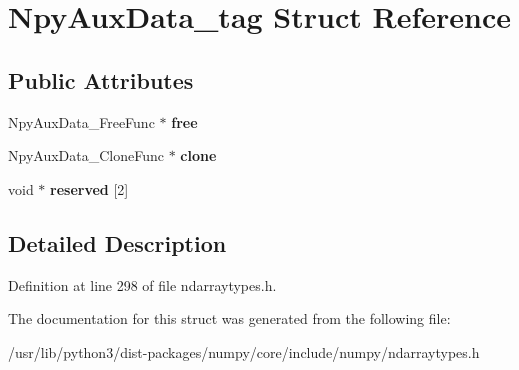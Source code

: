 \hypertarget{structNpyAuxData__tag}{}\section{Npy\+Aux\+Data\+\_\+tag Struct Reference}
\label{structNpyAuxData__tag}
\subsection*{Public Attributes}
\begin{DoxyCompactItemize}
\item 
Npy\+Aux\+Data\+\_\+\+Free\+Func $\ast$ {\bfseries free}\hypertarget{structNpyAuxData__tag_a203d57e146f8d0d905dcf06456b47987}{}\label{structNpyAuxData__tag_a203d57e146f8d0d905dcf06456b47987}

\item 
Npy\+Aux\+Data\+\_\+\+Clone\+Func $\ast$ {\bfseries clone}\hypertarget{structNpyAuxData__tag_ab578e7d069666b77bfcf9ff7c6139acf}{}\label{structNpyAuxData__tag_ab578e7d069666b77bfcf9ff7c6139acf}

\item 
void $\ast$ {\bfseries reserved} \mbox{[}2\mbox{]}\hypertarget{structNpyAuxData__tag_a36c294aac0233916f78a76fd6e78ff51}{}\label{structNpyAuxData__tag_a36c294aac0233916f78a76fd6e78ff51}

\end{DoxyCompactItemize}


\subsection{Detailed Description}


Definition at line 298 of file ndarraytypes.\+h.



The documentation for this struct was generated from the following file\+:\begin{DoxyCompactItemize}
\item 
/usr/lib/python3/dist-\/packages/numpy/core/include/numpy/ndarraytypes.\+h\end{DoxyCompactItemize}
